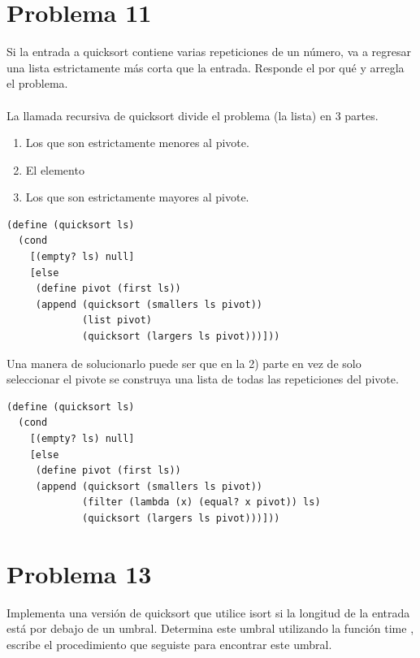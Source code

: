 \documentclass[a4paper,11pt]{article}
\theoremstyle{mytheor}
\begin{document}
\newpage
\section*{Problema 11}
Si la entrada a quicksort contiene varias repeticiones de un número, va a regresar
una lista estrictamente más corta que la entrada. Responde el por qué y arregla el problema. \\ \\

La llamada recursiva de quicksort divide el problema (la lista) en 3 partes.
\begin{enumerate}
\item Los que son estrictamente menores al pivote.
\item El elemento
\item Los que son estrictamente mayores al pivote.
\end{enumerate}
\begin{lstlisting}[title=quicksort]
(define (quicksort ls)
  (cond
    [(empty? ls) null]
    [else
     (define pivot (first ls))
     (append (quicksort (smallers ls pivot))
             (list pivot)
             (quicksort (largers ls pivot)))]))
\end{lstlisting}

Una manera de solucionarlo puede ser que en la 2) parte en vez de solo seleccionar el pivote se construya una lista de todas las repeticiones del pivote.
\begin{lstlisting}[title=quicksort]
(define (quicksort ls)
  (cond
    [(empty? ls) null]
    [else
     (define pivot (first ls))
     (append (quicksort (smallers ls pivot))
             (filter (lambda (x) (equal? x pivot)) ls)
             (quicksort (largers ls pivot)))]))
\end{lstlisting}

\section*{Problema 13}
Implementa una versión de quicksort que utilice isort si la longitud de la entrada está
por debajo de un umbral. Determina este umbral utilizando la función time , escribe el procedimiento
que seguiste para encontrar este umbral. \\ \\
\end{document}
